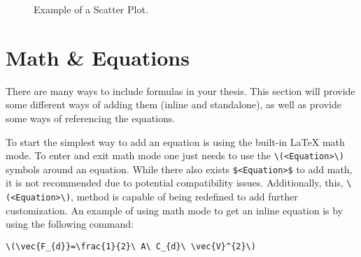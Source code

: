 		\begin{figure}[H]
			\centering
			\caption{Example of a Scatter Plot.}
			\label{fig:scatterplot}
		\end{figure}
  
		\clearpage
	\section{Math \& Equations}
		There are many ways to include formulas in your thesis. 
		This section will provide some different ways of adding them (inline and standalone), as well as provide some ways of referencing the equations.
  
		To start the simplest way to add an equation is using the built-in \LaTeX{} math mode. 
		To enter and exit math mode one just needs to use the \lstinline|\(<Equation>\)| symbols around an equation. While there also exists \lstinline|$<Equation>$| to add math, it is not recommended due to potential compatibility issues. Additionally, this, \lstinline|\(<Equation>\)|, method is capable of being redefined to add further customization. 
		An example of using math mode to get an inline equation is by using the following command:
  
		\begin{Center}
			\lstinline|\(\vec{F_{d}}=\frac{1}{2}\ A\ C_{d}\ \vec{V}^{2}\)|
		\end{Center}
  
